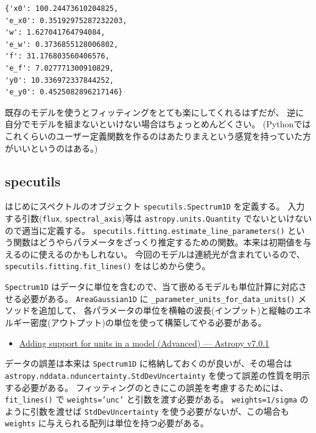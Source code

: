 \documentclass[a4paper, 9pt, notitlepage, uplatex, dvipdfmx]{jsarticle}
\begin{document}
\label{}
\begin{verbatim}
{'x0': 100.24473610204825,
'e_x0': 0.35192975287232203,
'w': 1.627041764794084,
'e_w': 0.3736855128006802,
'f': 31.176803560406576,
'e_f': 7.027771300910829,
'y0': 10.336972337844252,
'e_y0': 0.4525082896217146}
\end{verbatim}

既存のモデルを使うとフィッティングをとても楽にしてくれるはずだが、
逆に自分でモデルを組まないといけない場合はちょっとめんどくさい。
(Pythonではこれくらいのユーザー定義関数を作るのはあたりまえという感覚を持っていた方がいいというのはある。)
\subsection{specutils}
\label{sec:org594bba4}
はじめにスペクトルのオブジェクト \texttt{specutils.Spectrum1D} を定義する。
入力する引数(\texttt{flux}, \texttt{spectral\_axis})等は \texttt{astropy.units.Quantity} でないといけないので適当に定義する。
\texttt{specutils.fitting.estimate\_line\_parameters()} という関数はどうやらパラメータをざっくり推定するための関数。本来は初期値を与えるのに使えるのかもしれない。
今回のモデルは連続光が含まれているので、 \texttt{specutils.fitting.fit\_lines()} をはじめから使う。

\texttt{Spectrum1D} はデータに単位を含むので、当て嵌めるモデルも単位計算に対応させる必要がある。
\texttt{AreaGaussian1D} に \texttt{\_parameter\_units\_for\_data\_units()} メソッドを追加して、
各パラメータの単位を横軸の波長(インプット)と縦軸のエネルギー密度(アウトプット)の単位を使って構築してやる必要がある。
\begin{itemize}
\item \href{https://docs.astropy.org/en/stable/modeling/add-units.html}{Adding support for units in a model (Advanced) — Astropy v7.0.1}
\end{itemize}

データの誤差は本来は \texttt{Spectrum1D} に格納しておくのが良いが、その場合は \texttt{astropy.nddata.nduncertainty.StdDevUncertainty} を使って誤差の性質を明示する必要がある。
フィッティングのときにこの誤差を考慮するためには、 \texttt{fit\_lines()} で \texttt{weights='unc'} と引数を渡す必要がある。
\texttt{weights=1/sigma} のように引数を渡せば \texttt{StdDevUncertainty} を使う必要がないが、この場合も \texttt{weights} に与えられる配列は単位を持つ必要がある。
\end{document}
